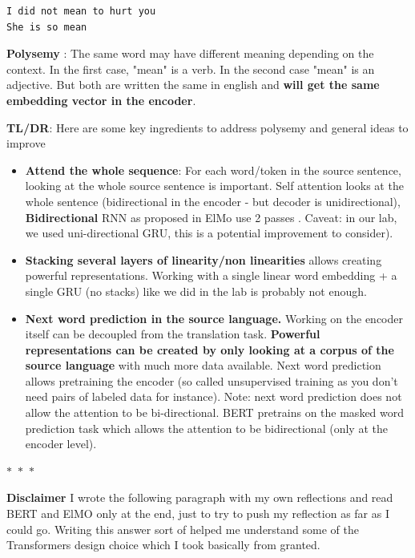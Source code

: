 \documentclass[a4paper]{article}
\begin{document}
\begin{verbatim}
I did not mean to hurt you
She is so mean
\end{verbatim}


\textbf{Polysemy} : The same word may have different meaning depending on the context. 
In the first case, "mean" is a verb. In the second case "mean" is an adjective. But both are written the same in english and \textbf{will get the same embedding vector in the encoder}.



\textbf{TL/DR}: Here are some key ingredients to address polysemy and general ideas to improve
\begin{itemize}
\item \textbf{Attend the whole sequence}: For each word/token in the source sentence, looking at the whole source sentence is important. Self attention looks at the whole sentence  \cite{vaswani2017attention_transformer} (bidirectional in the encoder - but decoder is unidirectional), \textbf{Bidirectional} RNN as proposed in ElMo use 2 passes \cite{context_rep} . Caveat: in our lab, we used uni-directional GRU, this is a potential improvement to consider).
\item \textbf{Stacking several layers of linearity/non linearities} allows creating powerful representations. Working with a single linear word embedding + a single  GRU (no stacks) like we did in the lab is probably not enough.
\item \textbf{Next word prediction in the source language.} Working on the encoder itself can be decoupled from the translation task. \textbf{Powerful representations can be created by only looking at a corpus of the source language} with much more data available. Next word prediction allows pretraining the encoder (so called unsupervised training as you don't need pairs of labeled data for instance). Note: next word prediction does not allow the attention to be bi-directional. BERT \cite{bert} pretrains on the masked word prediction task which allows the attention to be bidirectional (only at the encoder level).
\end{itemize}



\begin{center}
  $\ast$~$\ast$~$\ast$
\end{center}

\textbf{Disclaimer} I wrote the following paragraph with my own reflections and read BERT \cite{bert} and ElMO \cite{context_rep} only at the end, just to try to push my reflection as far as I could go.  Writing this answer sort of helped me understand some of the Transformers design choice which I took basically from granted.
\end{document}
